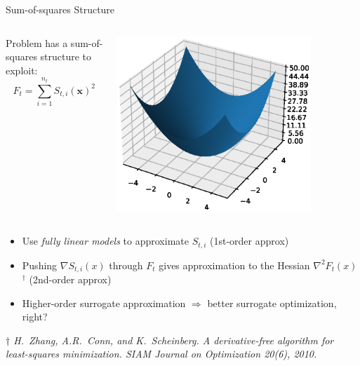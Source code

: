\documentclass[aspectratio=169]{beamer}
\newcommand{\vx}{\mathbf{x}}
\begin{document}
\begin{frame}{Sum-of-squares Structure}
\begin{columns}
\begin{column}{0.6\textwidth}
Problem has a sum-of-squares structure to exploit:
$$
F_t = \sum_{i=1}^{n_t}S_{t,i}(\vx)^2
$$
\end{column}
\begin{column}{0.4\textwidth}
\begin{center}
\includegraphics[width=0.8\textwidth]{quad.eps}
\end{center}
\end{column}
\end{columns}
\begin{itemize}
\item Use {\it fully linear models} to approximate $S_{t,i}$
(1st-order approx)
\item 
Pushing $\nabla S_{t,i}(x)$ through $F_t$ gives approximation to
the Hessian $\nabla^2 F_t(x)$ $^\dagger$ (2nd-order approx)
\item
Higher-order surrogate approximation
$\Rightarrow$ better surrogate optimization, right?
\end{itemize}

\vfill

{\tiny \it $\dagger$
H.~Zhang, A.R.~Conn, and K.~Scheinberg.
A derivative-free algorithm for least-squares minimization.
SIAM Journal on Optimization 20(6), 2010.

}

\end{frame}
\end{document}
